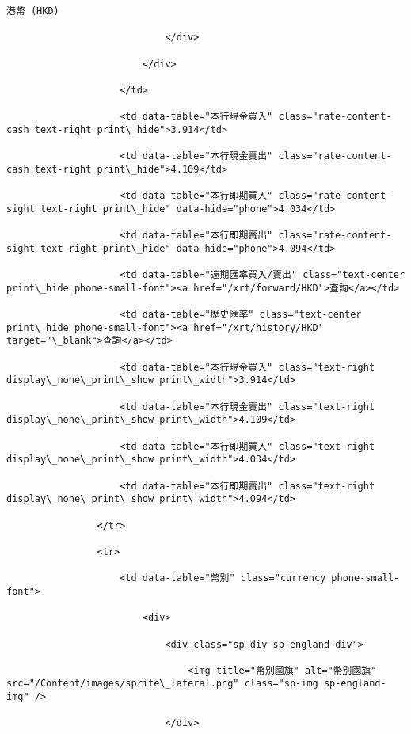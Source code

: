 \documentclass[11pt]{article}
\begin{document}
\begin{Verbatim}[commandchars=\\\{\}]
                                港幣 (HKD)

                            </div>

                        </div>

                    </td>

                    <td data-table="本行現金買入" class="rate-content-cash text-right print\_hide">3.914</td>

                    <td data-table="本行現金賣出" class="rate-content-cash text-right print\_hide">4.109</td>

                    <td data-table="本行即期買入" class="rate-content-sight text-right print\_hide" data-hide="phone">4.034</td>

                    <td data-table="本行即期賣出" class="rate-content-sight text-right print\_hide" data-hide="phone">4.094</td>

                    <td data-table="遠期匯率買入/賣出" class="text-center print\_hide phone-small-font"><a href="/xrt/forward/HKD">查詢</a></td>

                    <td data-table="歷史匯率" class="text-center print\_hide phone-small-font"><a href="/xrt/history/HKD" target="\_blank">查詢</a></td>

                    <td data-table="本行現金買入" class="text-right display\_none\_print\_show print\_width">3.914</td>

                    <td data-table="本行現金賣出" class="text-right display\_none\_print\_show print\_width">4.109</td>

                    <td data-table="本行即期買入" class="text-right display\_none\_print\_show print\_width">4.034</td>

                    <td data-table="本行即期賣出" class="text-right display\_none\_print\_show print\_width">4.094</td>

                </tr>

                <tr>

                    <td data-table="幣別" class="currency phone-small-font">

                        <div>

                            <div class="sp-div sp-england-div">

                                <img title="幣別國旗" alt="幣別國旗" src="/Content/images/sprite\_lateral.png" class="sp-img sp-england-img" />

                            </div>


\end{Verbatim}
\end{document}
